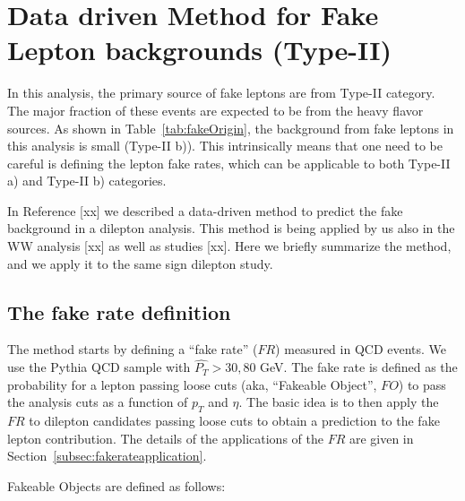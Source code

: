 \section{Data driven Method for Fake Lepton backgrounds (Type-II)}
\label{sec:leptonfake}

In this analysis, the primary source of fake leptons are from Type-II 
category. The major fraction of these events are expected to be from 
the heavy flavor sources. As shown in Table~\ref{tab:fakeOrigin}, the
background from fake leptons in this analysis is small (Type-II b)). This 
intrinsically means that one need to be careful is defining the lepton fake rates, 
which can be applicable to both Type-II a) and Type-II b) categories.

In Reference [xx] we described a data-driven method to predict the fake 
background in a dilepton analysis. This method is being applied by us also 
in the WW analysis [xx] as well as \ttbar studies [xx]. Here we briefly
summarize the method, and we apply it to the same sign dilepton study.

\subsection{The fake rate definition}
\label{subsec:fakeratedef}

The method starts by defining a “fake rate” ($FR$) measured in QCD events. We use 
the Pythia QCD sample with $\hat{P_T} > 30, 80 $ GeV. The fake rate is defined as 
the probability for a lepton passing loose cuts (aka, “Fakeable Object”, $FO$) to pass the 
analysis cuts as a function of $p_T$ and $\eta$. The basic idea is to then apply the $FR$ to 
dilepton candidates passing loose cuts to obtain a prediction to the fake lepton contribution. 
The details of the applications of the $FR$ are given in Section~\ref{subsec:fakerateapplication}. 

Fakeable Objects are defined as follows:

